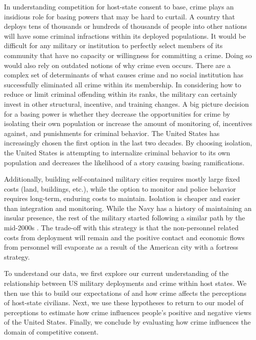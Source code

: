 In understanding competition for host-state consent to base, crime plays an insidious role for basing powers that may be hard to curtail. A country that deploys tens of thousands or hundreds of thousands of people into other nations will have some criminal infractions within its deployed populations. It would be difficult for any military or institution to perfectly select members of its community that have no capacity or willingness for committing a crime. Doing so would also rely on outdated notions of why crime even occurs. There are a complex set of determinants of what causes crime and no social institution has successfully eliminated all crime within its membership. In considering how to reduce or limit criminal offending within its ranks, the military can certainly invest in other structural, incentive, and training changes. A big picture decision for a basing power is whether they decrease the opportunities for crime by isolating their own population or increase the amount of monitoring of, incentives against, and punishments for criminal behavior.  The United States has increasingly chosen the first option in the last two decades. By choosing isolation, the United States is attempting to internalize criminal behavior to its own population and decreases the likelihood of a story causing basing ramifications.

Additionally, building self-contained military cities requires mostly large fixed costs (land, buildings, etc.), while the option to monitor and police behavior requires long-term, enduring costs to maintain. Isolation is cheaper and easier than integration and monitoring. While the Navy has a history of maintaining an insular presence, the rest of the military started following a similar path by the mid-2000s \cite{Gillem2007}. The trade-off with this strategy is that the non-personnel related costs from deployment will remain and the positive contact and economic flows from personnel will evaporate as a result of the American city with a fortress strategy. %

To understand our data, we first explore our current understanding of the relationship between US military deployments and crime within host states. We then use this to build our expectations of and how crime affects the perceptions of host-state civilians. Next, we use these hypotheses to return to our model of perceptions to estimate how crime influences people's positive and negative views of the United States. Finally, we conclude by evaluating how crime influences the domain of competitive consent.
